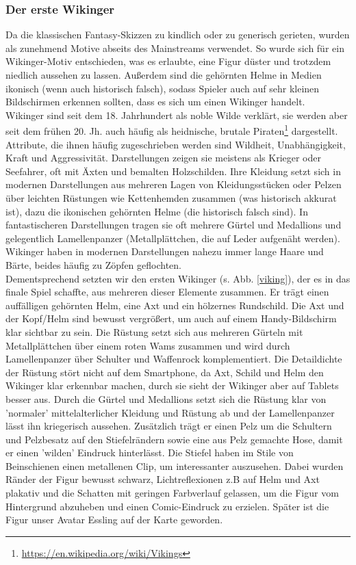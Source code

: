 \documentclass[extern,palatino]{cgBA}
\begin{document}
\subsubsection{Der erste Wikinger}
Da die klassischen Fantasy-Skizzen zu kindlich oder zu generisch gerieten, wurden als zunehmend Motive abseits des Mainstreams verwendet. So wurde sich für ein Wikinger-Motiv entschieden, was es erlaubte, eine Figur düster und trotzdem niedlich aussehen zu lassen. Außerdem sind die gehörnten Helme in Medien ikonisch (wenn auch historisch falsch), sodass Spieler auch auf sehr kleinen Bildschirmen erkennen sollten, dass es sich um einen Wikinger handelt.
\\Wikinger sind seit dem 18. Jahrhundert als noble Wilde verklärt, sie werden aber seit dem frühen 20. Jh. auch häufig als heidnische, brutale Piraten\footnote{\url{https://en.wikipedia.org/wiki/Vikings}} dargestellt.%
Attribute, die ihnen häufig zugeschrieben werden sind Wildheit, Unabhängigkeit, Kraft und Aggressivität. Darstellungen zeigen sie meistens als Krieger oder Seefahrer, oft mit Äxten und bemalten Holzschilden. Ihre Kleidung setzt sich in modernen Darstellungen aus mehreren Lagen von Kleidungsstücken oder Pelzen über leichten Rüstungen wie Kettenhemden zusammen (was historisch akkurat ist), dazu die ikonischen gehörnten Helme (die historisch falsch sind). In fantastischeren Darstellungen tragen sie oft mehrere Gürtel und Medallions und gelegentlich Lamellenpanzer (Metallplättchen, die auf Leder aufgenäht werden). Wikinger haben in modernen Darstellungen nahezu immer lange Haare und Bärte, beides häufig zu Zöpfen geflochten. 
\\Dementsprechend setzten wir den ersten Wikinger (s. Abb. \ref{viking}), der es in das finale Spiel schaffte, aus mehreren dieser Elemente zusammen. Er trägt einen auffälligen gehörnten Helm, eine Axt und ein hölzernes Rundschild. Die Axt und der Kopf/Helm sind bewusst vergrößert, um auch auf einem Handy-Bildschirm klar sichtbar zu sein. Die Rüstung setzt sich aus mehreren Gürteln mit Metallplättchen über einem roten Wams zusammen und wird durch Lamellenpanzer über Schulter und Waffenrock komplementiert. Die Detaildichte der Rüstung stört nicht auf dem Smartphone, da Axt, Schild und Helm den Wikinger klar erkennbar machen, durch sie sieht der Wikinger aber auf Tablets besser aus. Durch die Gürtel und Medallions setzt sich die Rüstung klar von 'normaler' mittelalterlicher Kleidung und Rüstung ab und der Lamellenpanzer lässt ihn kriegerisch aussehen. Zusätzlich trägt er einen Pelz um die Schultern und Pelzbesatz auf den Stiefelrändern sowie eine aus Pelz gemachte Hose, damit er einen 'wilden' Eindruck hinterlässt. Die Stiefel haben im Stile von Beinschienen einen metallenen Clip, um interessanter auszusehen. Dabei wurden Ränder der Figur bewusst schwarz, Lichtreflexionen z.B auf Helm und Axt plakativ und die Schatten mit geringen Farbverlauf gelassen, um die Figur vom Hintergrund abzuheben und einen Comic-Eindruck zu erzielen. Später ist die Figur unser Avatar Essling auf der Karte geworden.
	
\end{document}
